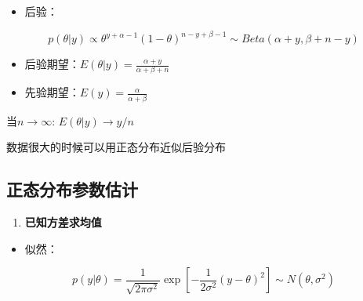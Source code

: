 \begin{itemize}
\item
  后验：
\end{itemize}

\[p(\theta|y)\propto \theta^{y+\alpha-1}(1-\theta)^{n-y+\beta-1}\sim Beta(\alpha+y,\beta+n-y)\]

\begin{itemize}
\item
  后验期望：\(E(\theta|y)=\frac{\alpha+y}{\alpha+\beta+n}\)
\item
  先验期望：\(E(y)=\frac{\alpha}{\alpha+\beta}\)
\end{itemize}

当\(n\rightarrow\infty\): \(E(\theta|y)\rightarrow y/n\)

数据很大的时候可以用正态分布近似后验分布

\subsection{正态分布参数估计}

\begin{enumerate}
\def\labelenumi{\arabic{enumi}.}
\item
  \textbf{已知方差求均值}
\end{enumerate}

\begin{itemize}
\item
  似然：
\end{itemize}

\begin{equation}
  p(y|\theta)=\frac{1}{\sqrt{2\pi\sigma^2}}
  \exp\left[-\frac{1}{2\sigma^2}(y-\theta)^2\right]
  \sim N(\theta,\sigma^2)
\end{equation}


